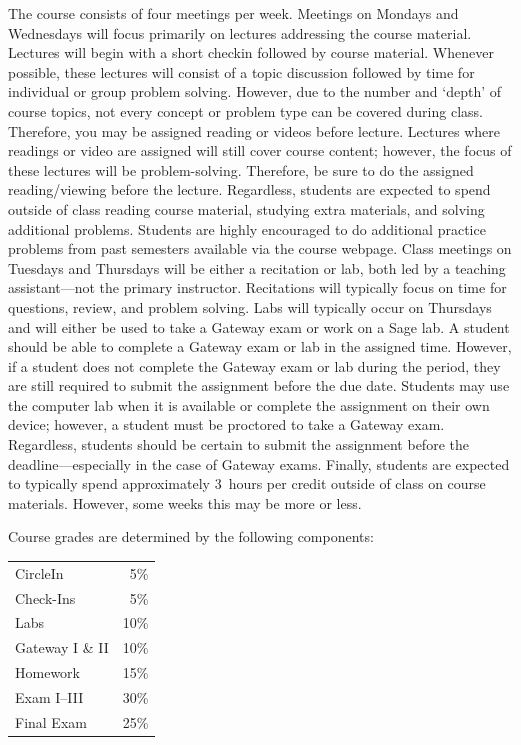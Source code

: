 \documentclass[11pt,letterpaper]{article}
\begin{document}
The course consists of four meetings per week. Meetings on Mondays and Wednesdays will focus primarily on lectures addressing the course material. Lectures will begin with a short checkin followed by course material. Whenever possible, these lectures will consist of a topic discussion followed by time for individual or group problem solving. However, due to the number and `depth' of course topics, not every concept or problem type can be covered during class. Therefore, you may be assigned reading or videos before lecture. Lectures where readings or video are assigned will still cover course content; however, the focus of these lectures will be problem-solving. Therefore, be sure to do the assigned reading/viewing before the lecture. Regardless, students are expected to spend outside of class reading course material, studying extra materials, and solving additional problems. Students are highly encouraged to do additional practice problems from past semesters available via the course webpage. Class meetings on Tuesdays and Thursdays will be either a recitation or lab, both led by a teaching assistant---not the primary instructor. Recitations will typically focus on time for questions, review, and problem solving. Labs will typically occur on Thursdays and will either be used to take a Gateway exam or work on a Sage lab. A student should be able to complete a Gateway exam or lab in the assigned time. However, if a student does not complete the Gateway exam or lab during the period, they are still required to submit the assignment before the due date. Students may use the computer lab when it is available or complete the assignment on their own device; however, a student must be proctored to take a Gateway exam. Regardless, students should be certain to submit the assignment before the deadline---especially in the case of Gateway exams. Finally, students are expected to typically spend approximately 3~hours per credit outside of class on course materials. However, some weeks this may be more or less. 
\sectionbreak








Course grades are determined by the following components: \par
	\begin{table}[!ht]
        \begin{tabular}{lr}
	CircleIn & 5\% \\
	Check-Ins & 5\% \\
	Labs & 10\% \\
	Gateway I \& II & 10\% \\
	Homework & 15\% \\
	Exam I--III & 30\% \\
	Final Exam & 25\%
        \end{tabular} 
        \end{table}
\sectionbreak
\end{document}
